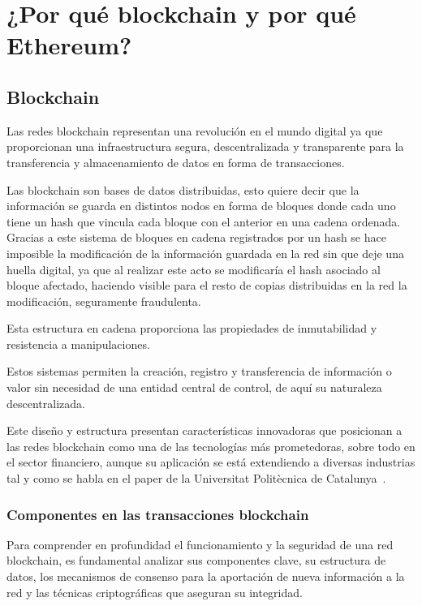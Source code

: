 \section{¿Por qué blockchain y por qué Ethereum?}

\subsection{Blockchain}

Las redes \gls{blockchain} representan una revolución en el mundo digital ya que proporcionan una 
infraestructura segura, 
descentralizada y transparente para la transferencia y almacenamiento de datos en forma de 
transacciones.

Las \gls{blockchain} son bases de datos distribuidas, esto quiere decir que la información se guarda 
en distintos nodos en forma de bloques donde cada uno tiene un \gls{hash} que vincula cada bloque 
con el anterior en una cadena ordenada.
Gracias a este sistema de bloques en cadena registrados por un \gls{hash}
se hace imposible la modificación de la información guardada en la red sin que deje una huella digital, 
ya que al realizar este acto se modificaría el \gls{hash} asociado al bloque afectado,
haciendo visible para el resto de copias distribuidas en la red la modificación, seguramente 
fraudulenta.

Esta estructura en cadena proporciona las propiedades de inmutabilidad y resistencia a manipulaciones.

Estos sistemas  permiten la creación, registro y transferencia de información o valor sin 
necesidad de una entidad central de control, de aquí su naturaleza descentralizada.

Este diseño y estructura presentan características innovadoras que posicionan a las redes 
\gls{blockchain} como una de las tecnologías más prometedoras, sobre todo en el sector financiero, 
aunque su aplicación se está extendiendo a diversas industrias tal y como se habla en el paper de 
la Universitat Politècnica de Catalunya~\cite{[4]}.

\subsubsection{Componentes en las transacciones blockchain}

Para comprender en profundidad el funcionamiento y la seguridad de una red blockchain, 
es fundamental analizar sus componentes clave, su estructura de datos, los mecanismos de consenso para 
la aportación de nueva información a la red y las técnicas criptográficas que aseguran su integridad.

